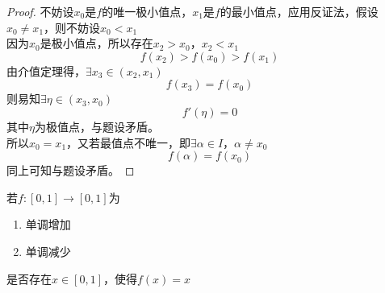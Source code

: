 \begin{proof}

    不妨设\(x_0\)是\(f\)的唯一极小值点，\(x_1\)是\(f\)的最小值点，应用反证法，假设\(x_0 \neq x_1\)，则不妨设\(x_0 < x_1\) \\
    因为\(x_0\)是极小值点，所以存在\( x_2 > x_0\)，\(x_2 < x_1\)
    \[f(x_2) > f(x_0) > f(x_1)\]
    由介值定理得，\(\exists x_3 \in (x_2, x_1)\)
    \[f(x_3) = f(x_0)\]
    则易知\(\exists \eta \in (x_3, x_0)\)
    \[f'(\eta) = 0\]
    其中\(\eta\)为极值点，与题设矛盾。\\
    所以\(x_0 = x_1\)，又若最值点不唯一，即\(\exists \alpha \in I\)，\(\alpha \neq x_0\)
    \[f(\alpha) = f(x_0)\]
    同上可知与题设矛盾。

\end{proof}

\begin{proposition}

    若\(f:[0, 1] \to [0, 1]\)为

    \begin{enumerate}

            \item 单调增加
            
            \item 单调减少

    \end{enumerate}

    是否存在\(x \in [0, 1]\)，使得\(f(x) = x\)

\end{proposition}

